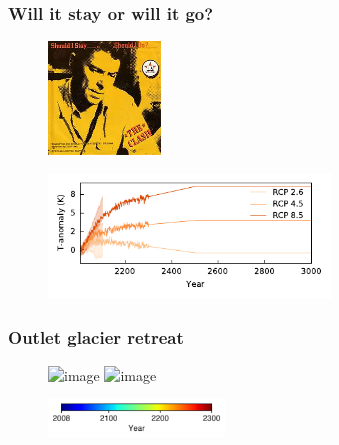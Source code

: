 \documentclass[hide notes,intlimits]{beamer}
\begin{document}
\begin{frame}
  \frametitle{Will it stay or will it go?}
  \begin{figure}
    \includegraphics[width=3cm]{clash}
  \end{figure}
  \begin{figure}
    \includegraphics[width=7.5cm]{giss_cmip5_delta_T}
  \end{figure}
\end{frame}



\begin{frame}
  \frametitle{Outlet glacier retreat}
  \begin{figure}
    \includegraphics<1>[height=7.25cm]{rcp45_Upernavik_Isstrom_S}
    \includegraphics<2>[height=7.25cm]{rcp45_Store_Gletscher}
  \end{figure}
  \vspace{-0.5cm}
  \begin{figure}
    \includegraphics[height=1cm]{jet_horizontal}
  \end{figure}
\end{frame}
\end{document}
